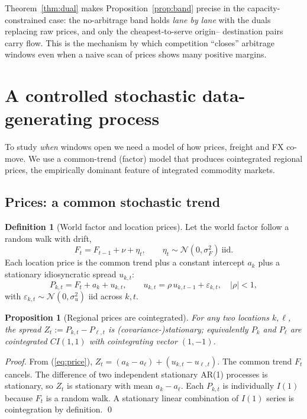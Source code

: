 \documentclass[11pt]{article}
\theoremstyle{definition}
\newtheorem{definition}{Definition}
\theoremstyle{plain}
\newtheorem{proposition}{Proposition}
\begin{document}
Theorem~\ref{thm:dual} makes Proposition~\ref{prop:band} precise in the
capacity-constrained case: the no-arbitrage band holds \emph{lane by lane} with
the duals replacing raw prices, and only the cheapest-to-serve origin--
destination pairs carry flow. This is the mechanism by which competition
``closes'' arbitrage windows even when a naive scan of prices shows many
positive margins.

\section{A controlled stochastic data-generating process}
\label{sec:dgp}

To study \emph{when} windows open we need a model of how prices, freight and FX
co-move. We use a common-trend (factor) model that produces cointegrated
regional prices, the empirically dominant feature of integrated commodity
markets.

\subsection{Prices: a common stochastic trend}

\begin{definition}[World factor and location prices]
Let the world factor follow a random walk with drift,
\begin{equation}
F_t = F_{t-1}+\nu+\eta_t,\qquad \eta_t\sim\mathcal N(0,\sigma_F^2)\ \text{iid}.
\end{equation}
Each location price is the common trend plus a constant intercept $a_k$ plus a
stationary idiosyncratic spread $u_{k,t}$:
\begin{equation}
P_{k,t}=F_t+a_k+u_{k,t},\qquad
u_{k,t}=\rho\,u_{k,t-1}+\varepsilon_{k,t},\quad |\rho|<1,
\label{eq:price}
\end{equation}
with $\varepsilon_{k,t}\sim\mathcal N(0,\sigma_u^2)$ iid across $k,t$.
\end{definition}

\begin{proposition}[Regional prices are cointegrated]
\label{prop:coint}
For any two locations $k,\ell$, the spread
$Z_{t}:=P_{k,t}-P_{\ell,t}$ is (covariance-)stationary; equivalently $P_{k}$ and
$P_{\ell}$ are cointegrated $CI(1,1)$ with cointegrating vector $(1,-1)$.
\end{proposition}

\begin{proof}
From (\ref{eq:price}), $Z_t=(a_k-a_\ell)+(u_{k,t}-u_{\ell,t})$. The common
trend $F_t$ cancels. The difference of two independent stationary AR(1)
processes is stationary, so $Z_t$ is stationary with mean $a_k-a_\ell$. Each
$P_{k,t}$ is individually $I(1)$ because $F_t$ is a random walk. A stationary
linear combination of $I(1)$ series is cointegration by definition. \qed
\end{proof}
\end{document}
